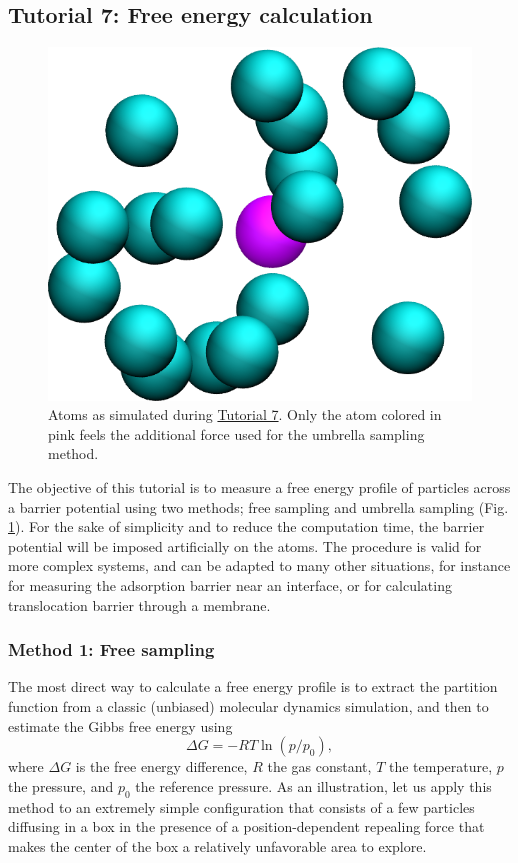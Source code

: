 \documentclass[9pt,tutorial]{livecoms}
\begin{document}
\subsection{Tutorial 7: Free energy calculation}
\label{umbrella-sampling-label}

\begin{figure}
\centering
\includegraphics[width=0.55\linewidth]{US}
\caption{Atoms as simulated during \hyperref[umbrella-sampling-label]{Tutorial 7}. Only the atom colored in pink feels the additional force used for the umbrella sampling method.}
\label{fig:US}
\end{figure}

\noindent The objective of this tutorial is to measure a free energy profile of particles across a barrier potential
using two methods; free sampling and umbrella sampling \cite{frenkel2023understanding} (Fig.\,\ref{fig:US}). For the sake of simplicity and to reduce the computation time, the barrier potential will be imposed artificially on the atoms. The procedure is valid for more complex systems, and can be adapted to many other situations, for instance for measuring the adsorption barrier near an interface, or for calculating translocation barrier through a membrane.

\subsubsection{Method 1: Free sampling}
The most direct way to calculate a free energy profile is to extract the partition function from a classic (unbiased) molecular
dynamics simulation, and then to estimate the Gibbs free energy using 
$$\Delta G = -RT \ln(p/p_0),$$
where $\Delta G$ is the free energy difference, $R$ the gas constant, $T$ the temperature, $p$ the pressure, and $p_0$ the reference pressure. As an illustration, let us apply this method to an extremely simple configuration that consists of a few particles diffusing in a box in the presence of a position-dependent repealing force that makes the center of the box a relatively unfavorable area to explore.
\end{document}
